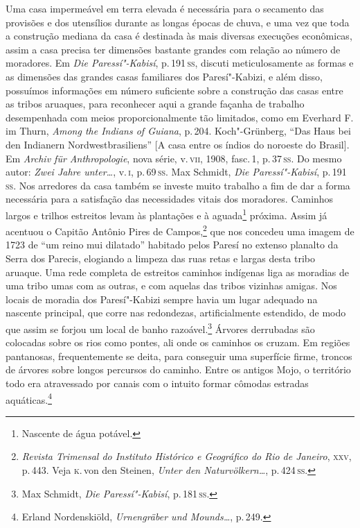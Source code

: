 Uma casa impermeável em terra elevada é necessária para o secamento das
provisões e dos utensílios durante as longas épocas de chuva, e uma vez
que toda a construção mediana da casa é destinada às mais diversas
execuções econômicas, assim a casa precisa ter dimensões bastante
grandes com relação ao número de moradores. Em \textit{Die Paressí"-Kabisí}, p.\,191\,\textsc{ss}, discuti meticulosamente as formas e as dimensões das grandes casas familiares dos Paresí"-Kabizi, e além disso, possuímos informações em número suficiente sobre a construção das casas entre as tribos aruaques, para reconhecer aqui a grande façanha de trabalho desempenhada com meios proporcionalmente tão limitados, como em Everhard F. im Thurn, \textit{Among the Indians of Guiana}, p.\,204. Koch"-Grünberg, ``Das Haus bei den Indianern Nordwestbrasiliens'' {[}A casa entre os índios do noroeste do Brasil{]}. Em \textit{Archiv für Anthropologie}, nova série, v.\,\textsc{vii}, 1908, fasc.\,1, p.\,37\,\textsc{ss}. Do mesmo autor: \textit{Zwei Jahre unter\ldots}, v.\,\textsc{i}, p.\,69\,\textsc{ss}. Max Schmidt, \textit{Die Paressí"-Kabisí}, p.\,191\,\textsc{ss}. Nos arredores da casa também
se investe muito trabalho a fim de dar a forma necessária para a
satisfação das necessidades vitais dos moradores. Caminhos largos e
trilhos estreitos levam às plantações e à aguada\footnote{Nascente de água potável.} próxima. Assim já
acentuou o Capitão Antônio Pires de Campos,\footnote{\textit{Revista
  Trimensal do Instituto Histórico e Geográfico do Rio de Janeiro}, \textsc{xxv},
  p.\,443. Veja \textsc{k}.\,von den Steinen, \textit{Unter den Naturvölkern\ldots}, p.\,424\,\textsc{ss}.} que nos concedeu uma imagem de 1723
de ``um reino mui dilatado'' habitado pelos Paresí no extenso planalto
da Serra dos Parecis, elogiando a limpeza das ruas retas e largas desta
tribo aruaque. Uma rede completa de estreitos caminhos indígenas liga as
moradias de uma tribo umas com as outras, e com aquelas das tribos
vizinhas amigas. Nos locais de moradia dos Paresí"-Kabizi sempre havia um
lugar adequado na nascente principal, que corre nas redondezas,
artificialmente estendido, de modo que assim se forjou um local de banho
razoável.\footnote{Max Schmidt, \textit{Die Paressí"-Kabisí}, p.\,181\,\textsc{ss}.}
Árvores derrubadas são colocadas sobre os rios como pontes, ali onde os
caminhos os cruzam. Em regiões pantanosas, frequentemente se deita, para conseguir
uma superfície firme,
troncos de árvores sobre longos percursos do caminho. Entre os antigos Mojo, o território todo era
atravessado por canais com o intuito formar cômodas estradas aquáticas.\footnote{Erland
  Nordenskiöld, \textit{Urnengräber und Mounds\ldots}, p.\,249.}

